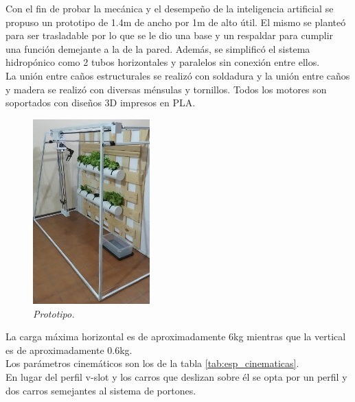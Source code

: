 Con el fin de probar la mecánica y el desempeño de la inteligencia artificial se propuso un prototipo de 1.4m de ancho por 1m de alto útil. El mismo se planteó para ser trasladable por lo que se le dio una base y un respaldar para cumplir una función demejante a la de la pared. Además, se simplificó el sistema hidropónico como 2 tubos horizontales y paralelos sin conexión entre ellos.\\
La unión entre caños estructurales se realizó con soldadura y la unión entre caños y madera se realizó con diversas ménsulas y tornillos. Todos los motores son soportados con diseños 3D impresos en PLA.
\begin{figure}[H]
    \centering
        \includegraphics[width=0.4\textwidth]{img/estructura.jpg}
        \caption{\textit{Prototipo.}}
        \label{fig:estructura}
\end{figure}

La carga máxima horizontal es de aproximadamente 6kg mientras que la vertical es de aproximadamente 0.6kg.\\
Los parámetros cinemáticos son los de la tabla \ref{tab:esp_cinematicas}.\\

En lugar del perfil v-slot y los carros que deslizan sobre él se opta por un perfil y dos carros semejantes al sistema de portones.\\

